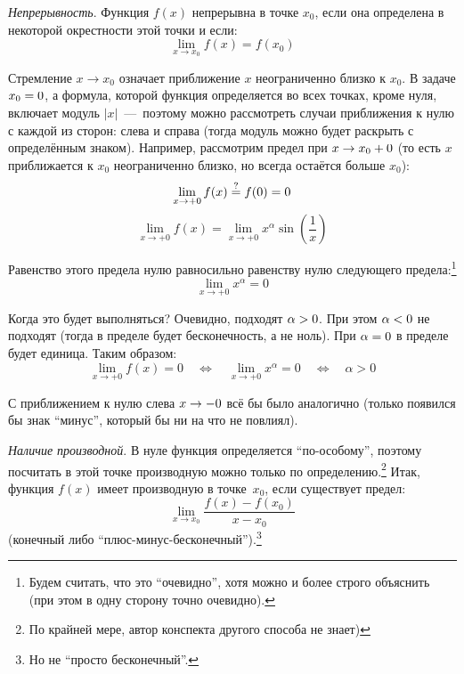 \documentclass[a4paper,12pt]{article}
\begin{document}
  \begin{solution}
    \mbox{}\par\noindent  %
    \emph{Непрерывность}.
    Функция $f(x)$ непрерывна в точке $x_0$, если она определена в некоторой окрестности этой точки и если:
    \[
      \lim_{x \to x_0} f(x) = f(x_0)
    \]

    Стремление $x \to x_0$ означает приближение $x$ неограниченно близко к $x_0$.
    В задаче $x_0 \hm= 0$, а формула, которой функция определяется во всех точках, кроме нуля, включает модуль $|x|$~---~поэтому можно рассмотреть случаи приближения к нулю с каждой из сторон: слева и справа (тогда модуль можно будет раскрыть с определённым знаком).
    Например, рассмотрим предел при $x \hm\to x_0 \hm+ 0$ (то есть $x$ приближается к $x_0$ неограниченно близко, но всегда остаётся больше $x_0$):
    \[
      \lim_{x \to +0} f(x) \overset{\operatorname{?}}{=} f(0) = 0
    \]
    \[
      \lim_{x \to +0} f(x)
        = \lim_{x \to +0} x^{\alpha} \sin{\left(\frac{1}{x}\right)}
    \]

    Равенство этого предела нулю равносильно равенству нулю следующего предела:\footnote{
      Будем считать, что это ``очевидно'', хотя можно и более строго объяснить (при этом в одну сторону точно очевидно).
    }
    \[
      \lim_{x \to +0} x^{\alpha} = 0
    \]

    Когда это будет выполняться?
    Очевидно, подходят $\alpha \hm> 0$.
    При этом $\alpha \hm< 0$ не подходят (тогда в пределе будет бесконечность, а не ноль).
    При $\alpha \hm= 0$ в пределе будет единица.
    Таким образом:
    \[
      \lim_{x \to +0} f(x) = 0
        \quad\Leftrightarrow\quad \lim_{x \to +0} x^{\alpha} = 0
        \quad\Leftrightarrow\quad \alpha > 0
    \]

    С приближением к нулю слева $x \hm\to -0$ всё бы было аналогично (только появился бы знак ``минус'', который бы ни на что не повлиял).

    \medskip
    
    \noindent
    \emph{Наличие производной}.
    В нуле функция определяется ``по-особому'', поэтому посчитать в этой точке производную можно только по определению.\footnote{
      По крайней мере, автор конспекта другого способа не знает)
    }
    Итак, функция $f(x)$ имеет производную в точке~$x_0$, если существует предел:
    \[
      \lim_{x \to x_0} \frac{f(x) - f(x_0)}{x - x_0}
    \]
    (конечный либо ``плюс-минус-бесконечный'').\footnote{
      Но не ``просто бесконечный''.
    }


\end{solution}
\end{document}
